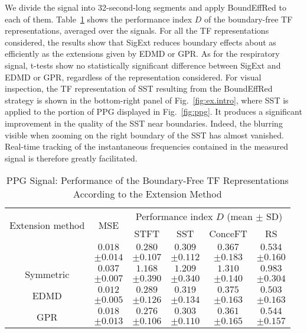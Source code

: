 We divide the signal into 32-second-long segments and apply {\sf BoundEffRed} to each of them. Table~\ref{tab:otd.ppg} shows the performance index $D$ of the boundary-free TF representations, averaged over the signals. For all the TF representations considered, the results show that {\sf SigExt} reduces boundary effects about as efficiently as the extensions given by EDMD or GPR. As for the respiratory signal, t-tests show no statistically significant difference between {\sf SigExt} and EDMD or GPR, regardless of the representation considered. For visual inspection, the TF representation of SST resulting from the {\sf BoundEffRed} strategy is shown in the bottom-right panel of Fig.~\ref{fig:ex.intro}, where SST is applied to the portion of PPG displayed in Fig.~\ref{fig:ppg}. It produces a significant improvement in the quality of the SST near boundaries. Indeed, the blurring visible when zooming on the right boundary of the SST has almost vanished. Real-time tracking of the instantaneous frequencies contained in the measured signal is therefore greatly facilitated.

\begin{table}
\centering
\caption{PPG Signal: Performance of the Boundary-Free TF Representations According to the Extension Method}
\begin{tabular}{|c||c||c|c|c|c|}
  \hline
   \multirow{2}{38pt}{\centering Extension method} & \multirow{2}{29pt}{\centering MSE} &\multicolumn{4}{c|}{Performance index $D$ (mean $\pm$ SD)} \\
   \cline{3-6}
      & & STFT & SST & ConceFT & RS\\
   \hhline{|=#=#=|=|=|=|}
   \multirow{2}{38pt}{\centering {\sf SigExt}} & $0.018$ & $0.280$ & $0.309$ & $0.367$ & $0.534$ \\
    & $\pm 0.014$ & $\pm 0.107$ & $\pm 0.112$ & $\pm 0.183$ & $\pm 0.160$ \\
   \hline
   \multirow{2}{38pt}{\centering Symmetric} & $0.037$ & $1.168$ & $1.209$ & $1.310$ & $0.983$ \\
   & $\pm 0.007$ & $\pm 0.390$ & $\pm 0.340$ & $\pm 0.140$ & $\pm 0.304$ \\
   \hline
   \multirow{2}{38pt}{\centering EDMD} & $0.012$ & $0.289$ & $0.319$ & $0.375$ & $0.503$ \\
   & $\pm 0.005$ & $\pm 0.126$ & $\pm 0.134$ & $\pm 0.163$ & $\pm 0.163$ \\
   \hline
   \multirow{2}{38pt}{\centering GPR} & $0.018$ & $0.276$ & $0.303$ & $0.361$ & $0.544$ \\
   & $\pm 0.013$ & $\pm 0.106$ & $\pm 0.110$ & $\pm 0.165$ & $\pm 0.157$ \\
   \hline
\end{tabular}
\label{tab:otd.ppg}
\end{table}

